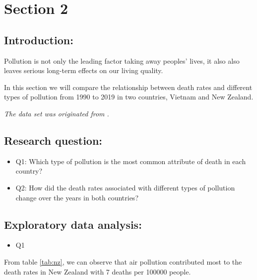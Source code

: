 \documentclass[11pt,a4paper,]{article}
\providecommand{\tightlist}{%
  \setlength{\itemsep}{0pt}\setlength{\parskip}{0pt}}
\begin{document}
\hypertarget{section-2}{%
\section{Section 2}\label{section-2}}

\hypertarget{introduction-1}{%
\subsection{Introduction:}\label{introduction-1}}

Pollution is not only the leading factor taking away peoples' lives, it also also leaves serious long-term effects on our living quality.

In this section we will compare the relationship between death rates and different types of pollution from 1990 to 2019 in two countries, Vietnam and New Zealand.

\emph{The data set was originated from \textcite{owidairpollution}.}

\hypertarget{research-question-1}{%
\subsection{Research question:}\label{research-question-1}}

\begin{itemize}
\item
  Q1: Which type of pollution is the most common attribute of death in each country?
\item
  Q2: How did the death rates associated with different types of pollution change over the years in both countries?
\end{itemize}

\hypertarget{exploratory-data-analysis-1}{%
\subsection{Exploratory data analysis:}\label{exploratory-data-analysis-1}}

\begin{itemize}
\tightlist
\item
  Q1
\end{itemize}

From table \ref{tab:nz}, we can observe that air pollution contributed most to the death rates in New Zealand with 7 deaths per 100000 people.
\end{document}
